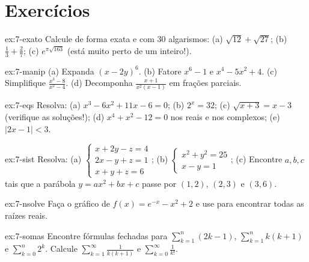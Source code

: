 \section{Exercícios}

\begin{exercicio}{ex:7-exato}
Calcule de forma exata e com 30 algarismos: (a) $\sqrt{12}+\sqrt{27}$; (b) $\frac{1}{3}+\frac{2}{7}$;
(c) $e^{\pi\sqrt{163}}$ (está muito perto de um inteiro!).
\end{exercicio}

\begin{exercicio}[manipulação]{ex:7-manip}
(a) Expanda $(x-2y)^6$. (b) Fatore $x^6-1$ e $x^4-5x^2+4$. (c) Simplifique $\frac{x^3-8}{x^2-4}$.
(d) Decomponha $\frac{x+1}{x^2(x-1)}$ em frações parciais.
\end{exercicio}

\begin{exercicio}[equações]{ex:7-eqs}
Resolva: (a) $x^3-6x^2+11x-6=0$; (b) $2^x=32$; (c) $\sqrt{x+3}=x-3$ (verifique as soluções!);
(d) $x^4+x^2-12=0$ nos reais e nos complexos; (e) $|2x-1|<3$.
\end{exercicio}

\begin{exercicio}[sistemas]{ex:7-sist}
Resolva: (a) $\begin{cases}x+2y-z=4\\2x-y+z=1\\x+y+z=6\end{cases}$; (b) $\begin{cases}x^2+y^2=25\\x-y=1\end{cases}$;
(c) Encontre $a,b,c$ tais que a parábola $y=ax^2+bx+c$ passe por $(1,2)$, $(2,3)$ e $(3,6)$.
\end{exercicio}

\begin{exercicio}[numérico]{ex:7-nsolve}
Faça o gráfico de $f(x)=e^{-x}-x^2+2$ e use  para encontrar todas as raízes reais.
\end{exercicio}

\begin{exercicio}[somatórios]{ex:7-somas}
Encontre fórmulas fechadas para $\sum_{k=1}^n (2k-1)$, $\sum_{k=1}^n k(k+1)$ e $\sum_{k=0}^n 2^k$. Calcule
$\sum_{k=1}^\infty\frac{1}{k(k+1)}$ e $\sum_{k=0}^\infty \frac{1}{k!}$.
\end{exercicio}
